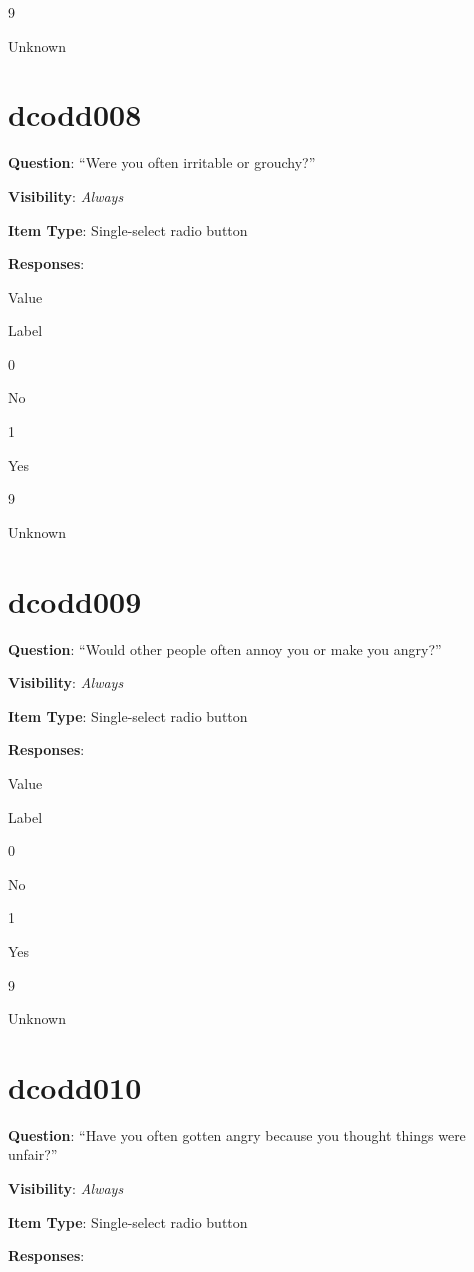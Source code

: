 \documentclass[]{book}
\begin{document}
9

Unknown

\hypertarget{dcodd008}{%
\section{dcodd008}\label{dcodd008}}

\textbf{Question}: ``Were you often irritable or grouchy?''

\textbf{Visibility}: \emph{Always}

\textbf{Item Type}: Single-select radio button

\textbf{Responses}:

Value

Label

0

No

1

Yes

9

Unknown

\hypertarget{dcodd009}{%
\section{dcodd009}\label{dcodd009}}

\textbf{Question}: ``Would other people often annoy you or make you angry?''

\textbf{Visibility}: \emph{Always}

\textbf{Item Type}: Single-select radio button

\textbf{Responses}:

Value

Label

0

No

1

Yes

9

Unknown

\hypertarget{dcodd010}{%
\section{dcodd010}\label{dcodd010}}

\textbf{Question}: ``Have you often gotten angry because you thought things were unfair?''

\textbf{Visibility}: \emph{Always}

\textbf{Item Type}: Single-select radio button

\textbf{Responses}:
\end{document}
